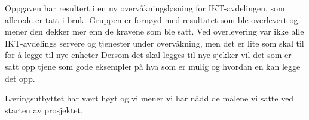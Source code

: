 Oppgaven har resultert i en ny overvåkningsløsning for IKT-avdelingen, som allerede er tatt i bruk. Gruppen er fornøyd med resultatet som ble overlevert og mener den dekker mer enn de kravene som ble satt. Ved overlevering var ikke alle IKT-avdelings servere og tjenester under overvåkning, men det er lite som skal til for å legge til nye enheter Dersom det skal legges til nye sjekker vil det som er satt opp tjene som gode eksempler på hva som er mulig og hvordan en kan legge det opp.

Læringsutbyttet har vært høyt og vi mener vi har nådd de målene vi satte ved starten av prosjektet. 



